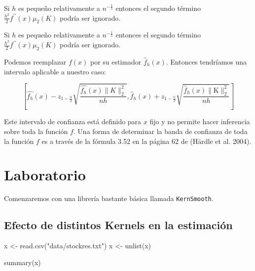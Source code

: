 \documentclass[
  12pt,
]{book}
\newenvironment{Shaded}{\begin{snugshade}}{\end{snugshade}}
\newcommand{\FunctionTok}[1]{\textcolor[rgb]{0.00,0.00,0.00}{#1}}
\newcommand{\NormalTok}[1]{#1}
\newcommand{\OtherTok}[1]{\textcolor[rgb]{0.56,0.35,0.01}{#1}}
\newcommand{\StringTok}[1]{\textcolor[rgb]{0.31,0.60,0.02}{#1}}
\begin{document}
Si \(h\) es pequeño relativamente a \(n^{-\frac{1}{5}}\) entonces el
segundo término \(\frac{h^{2}}{2} f^{\prime \prime}(x) \mu_{2}(K)\)
podría ser ignorado.

Si \(h\) es pequeño relativamente a \(n^{-\frac{1}{5}}\) entonces el
segundo término \(\frac{h^{2}}{2} f^{\prime \prime}(x) \mu_{2}(K)\)
podría ser ignorado.

Podemos reemplazar \(f(x)\) por su estimador \(\hat{f}_{h}(x)\).
Entonces tendríamos una intervalo aplicable a nuestro caso:

\begin{equation*}
\left[\hat{f_{h}}(x)-z_{1-\frac{\alpha}{2}} \sqrt{\frac{\hat{f_{h}}(x)\|K\|_{2}^{2}}{n h}}, \hat{f}_{h}(x)+z_{1-\frac{\alpha}{2}} \sqrt{\frac{\hat{f}_{h}(x)\|\mathrm{K}\|_{2}^{2}}{n h}}\right]
\end{equation*}

Este intervalo de confianza está definido para \(x\) fijo y no permite
hacer inferencia sobre toda la función \(f\). Una forma de determinar la
banda de confianza de toda la función \(f\) es a través de la fórmula
3.52 en la página 62 de (Härdle et al. 2004).

\hypertarget{laboratorio}{%
\section{Laboratorio}\label{laboratorio}}

Comenzaremos con una librería bastante básica llamada
\texttt{KernSmooth}.

\hypertarget{efecto-de-distintos-kernels-en-la-estimaciuxf3n}{%
\subsection{Efecto de distintos Kernels en la
estimación}\label{efecto-de-distintos-kernels-en-la-estimaciuxf3n}}

\begin{Shaded}
\begin{Highlighting}[]
\NormalTok{x }\OtherTok{\textless{}{-}} \FunctionTok{read.csv}\NormalTok{(}\StringTok{"data/stockres.txt"}\NormalTok{)}
\NormalTok{x }\OtherTok{\textless{}{-}} \FunctionTok{unlist}\NormalTok{(x)}
\end{Highlighting}
\end{Shaded}

\begin{Shaded}
\begin{Highlighting}[]
\FunctionTok{summary}\NormalTok{(x)}
\end{Highlighting}
\end{Shaded}
\end{document}
